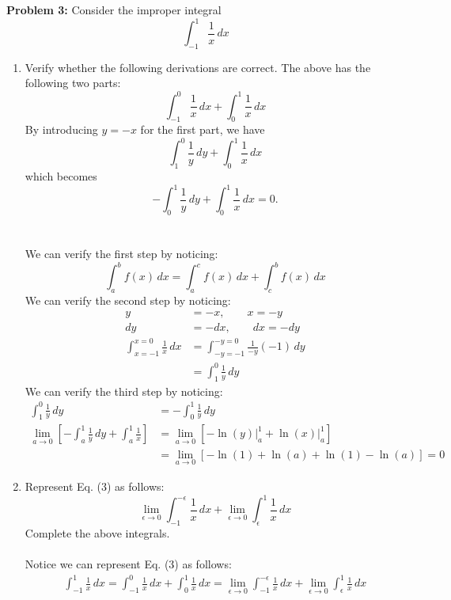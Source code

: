 \documentclass[11pt]{article}
\newenvironment{problem}[1]{\textbf{Problem #1: }}{\newpage}
\begin{document}
	\begin{problem}{3}
		 Consider the improper integral
		 \[\int_{-1}^{1} \frac{1}{x} \, dx \tag{3}\]
		 \begin{enumerate}[label = (\alph*)]
		 	\item  Verify whether the following derivations are correct.
		 	The above has the following two parts: 
		 	$$\int_{-1}^{0} \frac{1}{x}\,dx + \int_{0}^{1} \frac{1}{x}\,dx$$
		 	By introducing $y = -x$ for the first part, we have
		 	$$\int_{1}^{0} \frac{1}{y}\,dy + \int_{0}^{1} \frac{1}{x}\,dx$$
		 	which becomes
		 	$$-\int_{0}^{1} \frac{1}{y}\,dy + \int_{0}^{1} \frac{1}{x}\,dx = 0.$$
		 	\\ \\
		 	We can verify the first step by noticing:
		 	\[\int_{a}^{b} f(x)\,dx = \int_{a}^{c} f(x)\,dx + \int_{c}^{b} f(x)\,dx \tag{by Prop. of Integrals} \]
		 	We can verify the second step by noticing:
		 	\begin{align*}
		 		y &= -x, \qquad x = -y \\
		 		dy &= -dx, \qquad dx = -dy \\
		 		\int_{x = -1}^{x = 0} \frac{1}{x}\,dx &= \int_{-y = -1}^{-y = 0} \frac{1}{-y}(-1)\,dy \tag{by Subsitution}\\
		 		&= \int_{1}^{0} \frac{1}{y}\,dy \tag{Simplify}
		 	\end{align*}
		 	We can verify the third step by noticing:
		 	\begin{align*}
		 		\int_{1}^{0} \frac{1}{y}\,dy &= -\int_{0}^{1} \frac{1}{y}\,dy \tag{by the F.T.C}\\
		 		\lim\limits_{a \rightarrow 0}\left[ -\int_{a}^{1} \frac{1}{y}\,dy + \int_{a}^{1} \frac{1}{x}\right] &= \lim\limits_{a \rightarrow 0} \left[\left.-\ln(y)\right|_a^1 + \left.\ln(x)\right|_a^1\right] \tag{Use Limits for Improper Int}\\
		 		&= \lim\limits_{a \rightarrow 0}\left[ -\ln(1) + \ln(a) + \ln(1) - \ln(a) \right] = 0  \tag{Evaluate}
		 	\end{align*}
		 	\newpage
		 	\item Represent Eq. (3) as follows:
			$$\lim\limits_{\epsilon \rightarrow 0} \int_{-1}^{-\epsilon} \frac{1}{x}\,dx + \lim\limits_{\epsilon \rightarrow 0} \int_{\epsilon}^{1} \frac{1}{x}\,dx$$
			Complete the above integrals.
			\\ \\
			Notice we can represent Eq. (3) as follows:
				\begin{align*}
					\int_{-1}^{1} \frac{1}{x} \, dx = \int_{-1}^{0} \frac{1}{x}\,dx + \int_{0}^{1} \frac{1}{x}\,dx = \lim\limits_{\epsilon \rightarrow 0} \int_{-1}^{-\epsilon} \frac{1}{x}\,dx + \lim\limits_{\epsilon \rightarrow 0} \int_{\epsilon}^{1} \frac{1}{x}\,dx

\end{align*}
\end{enumerate}
\end{problem}
\end{document}
